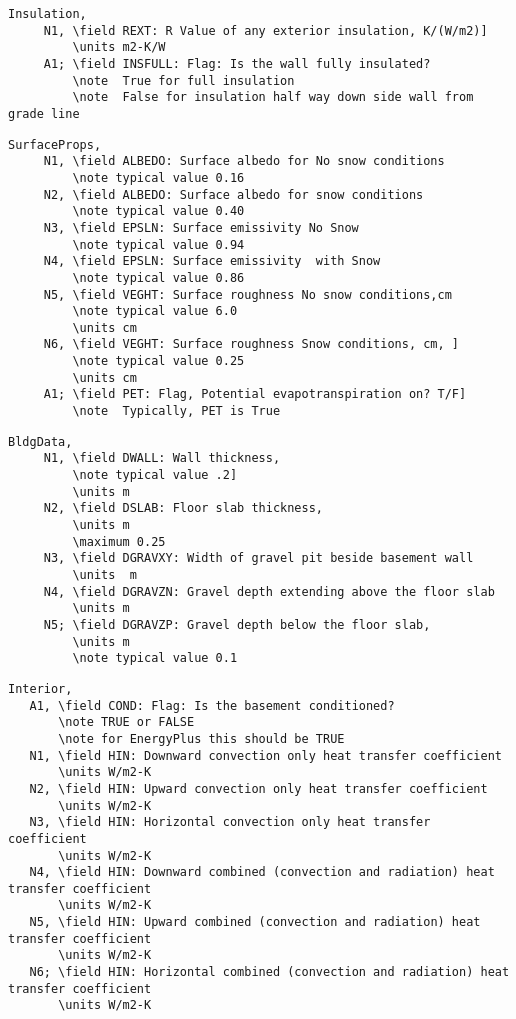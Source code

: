 \begin{lstlisting}
Insulation,
     N1, \field REXT: R Value of any exterior insulation, K/(W/m2)]
         \units m2-K/W
     A1; \field INSFULL: Flag: Is the wall fully insulated?
         \note  True for full insulation
         \note  False for insulation half way down side wall from grade line
\end{lstlisting}

\begin{lstlisting}
SurfaceProps,
     N1, \field ALBEDO: Surface albedo for No snow conditions
         \note typical value 0.16
     N2, \field ALBEDO: Surface albedo for snow conditions
         \note typical value 0.40
     N3, \field EPSLN: Surface emissivity No Snow
         \note typical value 0.94
     N4, \field EPSLN: Surface emissivity  with Snow
         \note typical value 0.86
     N5, \field VEGHT: Surface roughness No snow conditions,cm
         \note typical value 6.0
         \units cm
     N6, \field VEGHT: Surface roughness Snow conditions, cm, ]
         \note typical value 0.25
         \units cm
     A1; \field PET: Flag, Potential evapotranspiration on? T/F]
         \note  Typically, PET is True
\end{lstlisting}

\begin{lstlisting}
BldgData,
     N1, \field DWALL: Wall thickness,
         \note typical value .2]
         \units m
     N2, \field DSLAB: Floor slab thickness,
         \units m
         \maximum 0.25
     N3, \field DGRAVXY: Width of gravel pit beside basement wall
         \units  m
     N4, \field DGRAVZN: Gravel depth extending above the floor slab
         \units m
     N5; \field DGRAVZP: Gravel depth below the floor slab,
         \units m
         \note typical value 0.1
\end{lstlisting}

\begin{lstlisting}
Interior,
   A1, \field COND: Flag: Is the basement conditioned?
       \note TRUE or FALSE
       \note for EnergyPlus this should be TRUE
   N1, \field HIN: Downward convection only heat transfer coefficient
       \units W/m2-K
   N2, \field HIN: Upward convection only heat transfer coefficient
       \units W/m2-K
   N3, \field HIN: Horizontal convection only heat transfer coefficient
       \units W/m2-K
   N4, \field HIN: Downward combined (convection and radiation) heat transfer coefficient
       \units W/m2-K
   N5, \field HIN: Upward combined (convection and radiation) heat transfer coefficient
       \units W/m2-K
   N6; \field HIN: Horizontal combined (convection and radiation) heat transfer coefficient
       \units W/m2-K
\end{lstlisting}

